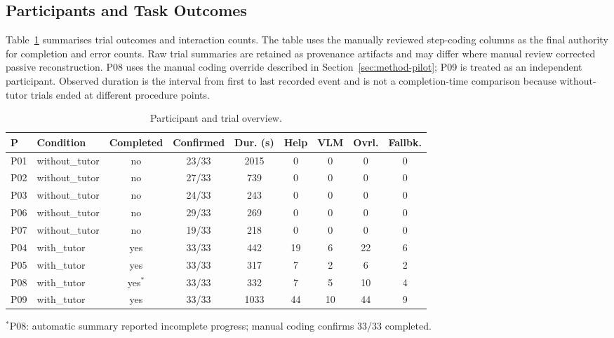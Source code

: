 \subsection{Participants and Task Outcomes}

Table~\ref{tab:pilot-overview} summarises trial outcomes and interaction
counts. The table uses the manually reviewed step-coding columns as the final
authority for completion and error counts. Raw trial summaries are retained as
provenance artifacts and may differ where manual review corrected passive
reconstruction. P08 uses the manual coding override described in
Section~\ref{sec:method-pilot}; P09 is treated as an independent participant.
Observed duration is the interval from first to last recorded event and is not
a completion-time comparison because without-tutor trials ended at different
procedure points.

\begin{table}[htbp]
\centering
\caption{Participant and trial overview.}
\label{tab:pilot-overview}
\footnotesize
\setlength{\tabcolsep}{3pt}
\begin{tabular}{@{}llccccccc@{}}
\toprule
\textbf{P} & \textbf{Condition} & \textbf{Completed} & \textbf{Confirmed} & \textbf{Dur. (s)} & \textbf{Help} & \textbf{VLM} & \textbf{Ovrl.} & \textbf{Fallbk.} \\
\midrule
P01 & without\_tutor & no & 23/33 & 2015 & 0 & 0 & 0 & 0 \\
P02 & without\_tutor & no & 27/33 & 739  & 0 & 0 & 0 & 0 \\
P03 & without\_tutor & no & 24/33 & 243  & 0 & 0 & 0 & 0 \\
P06 & without\_tutor & no & 29/33 & 269  & 0 & 0 & 0 & 0 \\
P07 & without\_tutor & no & 19/33 & 218  & 0 & 0 & 0 & 0 \\
\midrule
P04 & with\_tutor & yes & 33/33 & 442  & 19 & 6  & 22 & 6 \\
P05 & with\_tutor & yes & 33/33 & 317  & 7  & 2  & 6  & 2 \\
P08 & with\_tutor & yes$^*$ & 33/33 & 332  & 7  & 5  & 10 & 4 \\
P09 & with\_tutor & yes & 33/33 & 1033 & 44 & 10 & 44 & 9 \\
\bottomrule
\end{tabular}

$^*$P08: automatic summary reported incomplete progress; manual coding
confirms 33/33 completed.
\end{table}

